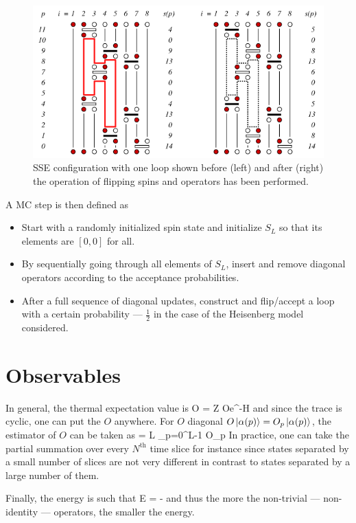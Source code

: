 		\begin{figure}[h!]
            \centering
            \includegraphics[scale=0.5]{graphs/SSEloop.png}
            \caption{SSE configuration with one loop shown before (left) and after (right) the operation of flipping spins and operators has been performed.}
            \label{fig:SSEloop}
        \end{figure}

		A MC step is then defined as
		\begin{itemize}
			\item Start with a randomly initialized spin state and initialize $S_L$ so that its elements are $[0,0]$ for all.
			\item By sequentially going through all elements of $S_L$, insert and remove diagonal operators according to the acceptance probabilities.
			\item After a full sequence of diagonal updates, construct and flip/accept a loop with a certain probability --- $\frac 1 2$ in the case of the Heisenberg model considered.
		\end{itemize}

	\section{Observables}

		In general, the thermal expectation value is
		\be \ev O =  Z \tr Oe^{-\beta \mc H} \ee
		and since the trace is cyclic, one can put the $O$ anywhere. For $O$ diagonal $O\ket{\alpha(p)} = O_p \ket{\alpha(p)}$, the estimator of $O$ can be taken as 
		\be {} =  L \sum_{p=0}^{L-1} O_p \ee
		In practice, one can take the partial summation over every $N^\text{th}$ time slice for instance since states separated by a small number of slices are not very different in contrast to states separated by a large number of them. 

		Finally, the energy is such that
		\be E = - \ee
		and thus the more the non-trivial --- non-identity --- operators, the smaller the energy.



